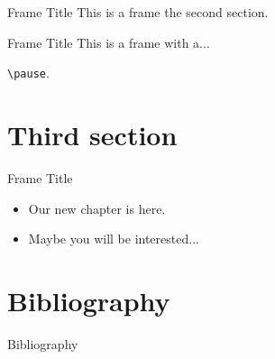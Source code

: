 \documentclass{beamer}
\begin{document}
    \begin{frame}{Frame Title}
        This is a frame the second section.
    \end{frame}

    \begin{frame}{Frame Title}
        This is a frame with a...

        \pause

        \texttt{\textbackslash pause}.
    \end{frame}

\section{Third section}
    \begin{frame}{Frame Title}
        \begin{itemize}
            \item Our new chapter is here.
            \item Maybe you will be interested...
        \end{itemize}
    \end{frame}



\section{Bibliography}

    \nocite{einstein, knuthwebsite, latexcompanion}
    
    \begin{frame}{Bibliography}
        
        
    \end{frame}
\end{document}
